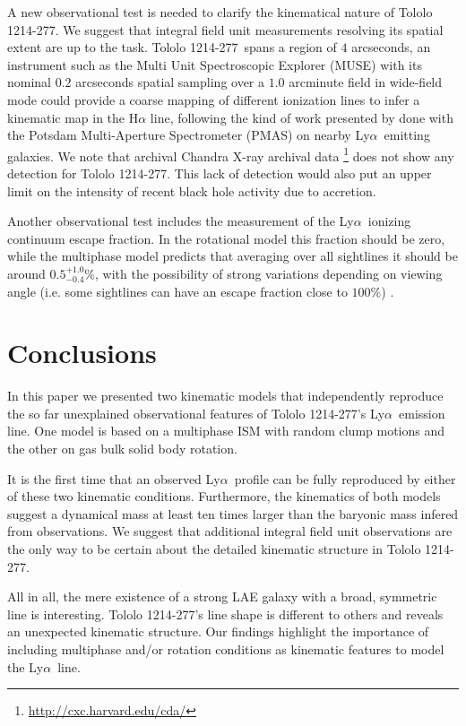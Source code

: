 \documentclass[a4,useAMS,usenatbib,usegraphicx]{mn2e}
\newcommand{\tol}{Tololo 1214-277}
\newcommand{\lya}{Ly$\alpha$}
\begin{document}
A new observational test is needed to clarify the kinematical nature of
\tol. 
We suggest that integral field unit measurements 
resolving its spatial extent are up to the task. 
\tol\ spans a region of $4$ arcseconds,
an instrument such as the Multi Unit Spectroscopic Explorer (MUSE)
\citep{2014Msngr.157...13B} with its
nominal $0.2$ arcseconds spatial sampling over a $1.0$ arcminute field
in wide-field mode could provide a coarse mapping of different
ionization lines to infer a kinematic map in the H$\alpha$ line,
following the kind of work presented by \citet{Herenz16} done with the Potsdam
Multi-Aperture Spectrometer (PMAS) \citet{PMAS} on nearby
\lya\ emitting galaxies.
We note that archival Chandra X-ray archival
data \footnote{\url{http://cxc.harvard.edu/cda/}} does not show any
detection for \tol.
This lack of detection would also put an upper limit on the intensity
of recent black hole activity due to accretion. 

Another observational test includes the measurement of the
\lya\ ionizing continuum escape fraction.
In the rotational model this fraction should be zero, while
the multiphase model predicts that averaging over all sightlines
it should be around $0.5^{+1.0}_{-0.4}$\%, with the possibility of strong
variations depending on viewing angle (i.e. some sightlines can have
an escape fraction close to $100\%$)\citep{Gronke2016} . 



\section{Conclusions}

In this paper we presented two kinematic models that independently
reproduce the so far unexplained observational features of \tol's
\lya\ emission line.  One model is based on a multiphase ISM with random clump motions and
the other on gas bulk solid body rotation.

It is the first time that an observed \lya\ profile can be fully
reproduced by either of these two kinematic conditions.
Furthermore, the kinematics of both models suggest a dynamical mass
at least ten times larger than the baryonic mass infered from observations.
We suggest that additional integral field unit observations are the
only way to be certain about the detailed kinematic structure in \tol.

All in all, the mere existence of a strong LAE galaxy with a broad,
symmetric line is interesting. 
\tol's line shape is different to others and reveals an unexpected
kinematic structure.
Our findings highlight the importance of including multiphase and/or
rotation conditions as kinematic features to model the \lya\ line.
\end{document}
